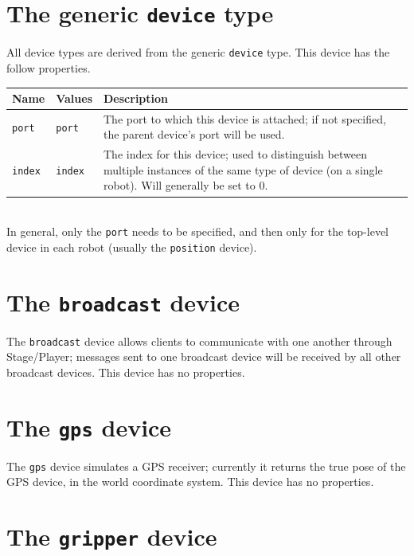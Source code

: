 \documentclass[11pt,twoside]{report}
\begin{document}
\newpage
\section{The generic {\tt device} type}

All device types are derived from the generic \verb'device' type.
This device has the follow properties.
\vspace{1em}\\\noindent
\begin{tabularx}{\columnwidth}{llX}
\hline
Name & Values & Description \\
\hline

\verb'port' & \verb'port' & The port to which this device is attached;
if not specified, the parent device's port will be used.\\

\verb'index' & \verb'index' & The index for this device; used to
distinguish between multiple instances of the same type of device (on
a single robot).  Will generally be set to 0.\\

\hline
\end{tabularx}
\vspace{1em}\\
\noindent In general, only the \verb'port' needs to be specified, and
then only for the top-level device in each robot (usually the
\verb'position' device).


\newpage
\section{The {\tt broadcast} device}

The {\tt broadcast} device allows clients to communicate with one
another through Stage/Player; messages sent to one broadcast device
will be received by all other broadcast devices.  This device has no
properties.


\newpage
\section{The {\tt gps} device}

The {\tt gps} device simulates a GPS receiver; currently it returns
the true pose of the GPS device, in the world coordinate system.  This
device has no properties.


\newpage
\section{The {\tt gripper} device}
\end{document}

